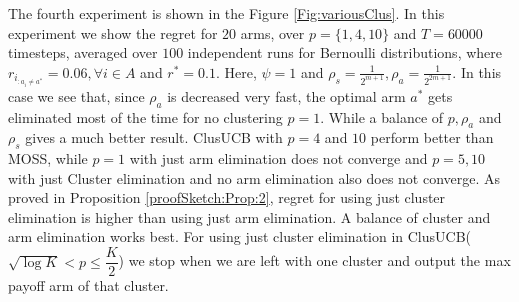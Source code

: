 The fourth experiment is shown in the Figure \ref{Fig:variousClus}. In this experiment we show the regret for $20$ arms, over $p=\lbrace 1,4,10\rbrace$ and $T=60000$ timesteps, averaged over $100$ independent runs for Bernoulli distributions, where $r_{i_{:{a_{i}\neq a^{*}}}}=0.06,\forall i\in A$ and $r^{*}=0.1$. Here, $\psi=1$ and $\rho_{s}=\frac{1}{2^{m+1}},\rho_{a}=\frac{1}{2^{2m+1}}$. In this case we see that, since $\rho_{a}$ is decreased very fast, the optimal arm $a^{*}$ gets eliminated most of the time for no clustering $p=1$. While a balance of $p,\rho_{a}$ and $\rho_{s}$ gives a much better result. ClusUCB with $p=4$ and $10$ perform better than MOSS, while $p=1$ with just arm elimination does not converge and $p=5,10$ with just Cluster elimination and no arm elimination also does not converge. As proved in Proposition \ref{proofSketch:Prop:2}, regret for using just cluster elimination is higher than using just arm elimination. A balance of cluster and arm elimination works best. For using just 
cluster elimination in ClusUCB($\sqrt{\log K}<p\leq \dfrac{K}{2}$) we stop when we are left with one cluster and output the max payoff arm of that cluster.

